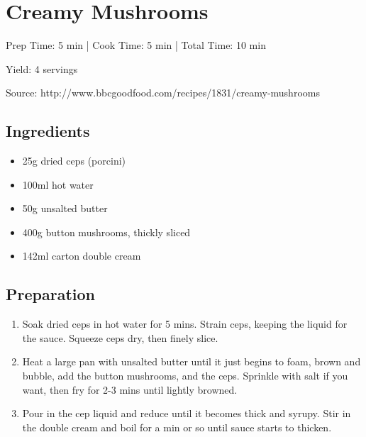 \section{Creamy Mushrooms}

\begin{center}
Prep Time: 5 min |
Cook Time: 5 min |
Total Time: 10 min

\noindent Yield: 4 servings

\vspace{1em}

Source: http://www.bbcgoodfood.com/recipes/1831/creamy-mushrooms
\end{center}

\subsection{Ingredients}
\begin{multicols}{2}
\begin{itemize}
    \item 25g dried ceps (porcini)
    \item 100ml hot water
    \item 50g unsalted butter
    \item 400g button mushrooms, thickly sliced
    \item 142ml carton double cream
\end{itemize}
\end{multicols}

\subsection{Preparation}
\begin{enumerate}
    \item Soak dried ceps in hot water for 5 mins. Strain ceps, keeping the liquid for the sauce. Squeeze ceps dry, then finely slice.
    \item Heat a large pan with unsalted butter until it just begins to foam, brown and bubble, add the button mushrooms, and the ceps. Sprinkle with salt if you want, then fry for 2-3 mins until lightly browned.
    \item Pour in the cep liquid and reduce until it becomes thick and syrupy. Stir in the double cream and boil for a min or so until sauce starts to thicken.
\end{enumerate}
